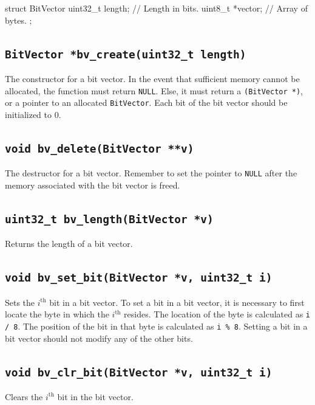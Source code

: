 \documentclass[11pt]{article}
\begin{document}
\begin{codelisting}{}
struct BitVector {
    uint32_t length; // Length in bits.
    uint8_t *vector; // Array of bytes.
};
\end{codelisting}

\subsection{\texttt{BitVector *bv\_create(uint32\_t length)}}

The constructor for a bit vector. In the event that sufficient memory
cannot be allocated, the function must return \texttt{NULL}. Else, it
must return a \texttt{(BitVector *)}, or a pointer to an allocated
\texttt{BitVector}. Each bit of the bit vector should be initialized to
0.

\subsection{\texttt{void bv\_delete(BitVector **v)}}

The destructor for a bit vector. Remember to set the pointer to
\texttt{NULL} after the memory associated with the bit vector is freed.

\subsection{\texttt{uint32\_t bv\_length(BitVector *v)}}

Returns the length of a bit vector.

\subsection{\texttt{void bv\_set\_bit(BitVector *v, uint32\_t i)}}

Sets the $i^\text{th}$ bit in a bit vector. To set a bit in a bit
vector, it is necessary to first locate the byte in which the
$i^\text{th}$ resides. The location of the byte is calculated as
\texttt{i / 8}. The position of the bit in that byte is calculated as
\texttt{i \% 8}. Setting a bit in a bit vector should not modify any of
the other bits.

\subsection{\texttt{void bv\_clr\_bit(BitVector *v, uint32\_t i)}}

Clears the $i^\text{th}$ bit in the bit vector.
\end{document}
